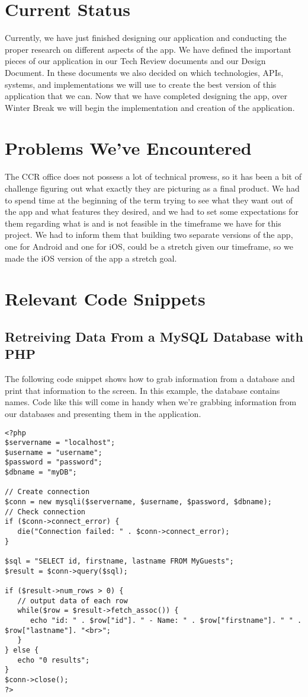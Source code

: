 \documentclass[draftclsnofoot, onecolumn, 10pt, compsoc]{IEEEtran}
\begin{document}
   \section{Current Status}
   Currently, we have just finished designing our application and conducting the proper research on different aspects of the app. We have defined the important pieces of our application in our Tech Review documents and our Design Document. In these documents we also decided on which technologies, APIs, systems, and implementations we will use to create the best version of this application that we can. Now that we have completed designing the app, over Winter Break we will begin the implementation and creation of the application.

   \section{Problems We've Encountered}
   The CCR office does not possess a lot of technical prowess, so it has been a bit of challenge figuring out what exactly they are picturing as a final product. We had to spend time at the beginning of the term trying to see what they want out of the app and what features they desired, and we had to set some expectations for them regarding what is and is not feasible in the timeframe we have for this project. We had to inform them that building two separate versions of the app, one for Android and one for iOS, could be a stretch given our timeframe, so we made the iOS version of the app a stretch goal.

   \section{Relevant Code Snippets}
      \subsection{Retreiving Data From a MySQL Database with PHP}
      The following code snippet shows how to grab information from a database and print that information to the screen. In this example, the database contains names. Code like this will come in handy when we're grabbing information from our databases and presenting them in the application.
      \begin{lstlisting}[style=php]
<?php
$servername = "localhost";
$username = "username";
$password = "password";
$dbname = "myDB";

// Create connection
$conn = new mysqli($servername, $username, $password, $dbname);
// Check connection
if ($conn->connect_error) {
   die("Connection failed: " . $conn->connect_error);
}

$sql = "SELECT id, firstname, lastname FROM MyGuests";
$result = $conn->query($sql);

if ($result->num_rows > 0) {
   // output data of each row
   while($row = $result->fetch_assoc()) {
      echo "id: " . $row["id"]. " - Name: " . $row["firstname"]. " " . $row["lastname"]. "<br>";
   }
} else {
   echo "0 results";
}
$conn->close();
?>
      \end{lstlisting}
      ~\cite{MySQL}
\end{document}
